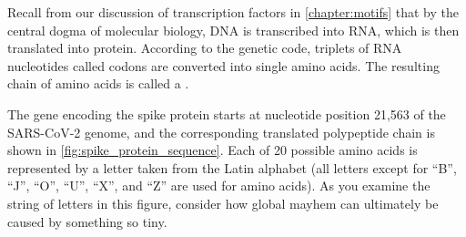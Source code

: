 Recall from our discussion of transcription factors in \autoref{chapter:motifs} that by the central dogma of molecular biology, DNA is transcribed into RNA, which is then translated into protein. According to the genetic code, triplets of RNA nucleotides called codons are converted into single amino acids. The resulting chain of amino acids is called a .

The gene encoding the spike protein starts at nucleotide position 21,563 of the SARS-CoV-2 genome, and the corresponding translated polypeptide chain is shown in \autoref{fig:spike_protein_sequence}. Each of 20 possible amino acids is represented by a letter taken from the Latin alphabet (all letters except for ``B'', ``J'', ``O'', ``U'', ``X'', and ``Z'' are used for amino acids). As you examine the string of letters in this figure, consider how global mayhem can ultimately be caused by something so tiny.

